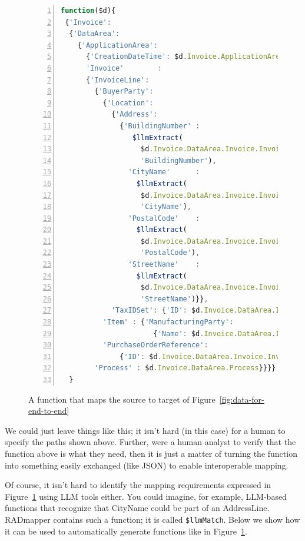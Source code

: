 \documentclass[10pt,letterpaper]{article} %
\newcommand{\stt}[1]{\texttt{#1}} %
\begin{document}
\begin{figure}[H]
  \caption{A function that maps the source to target of Figure~\ref{fig:data-for-end-to-end}}
  \label{fig:mapping-src2tar}
\begin{lstlisting}[language=JavaScript,numberstyle=\scriptsize,basicstyle=\ttfamily\scriptsize,numbers=left,stepnumber=1,breaklines=true]
function($d){
 {'Invoice':
  {'DataArea':
    {'ApplicationArea':
      {'CreationDateTime': $d.Invoice.ApplicationArea.CreationDateTime},
      'Invoice'        :
      {'InvoiceLine':
        {'BuyerParty':
          {'Location':
            {'Address':
              {'BuildingNumber' :
                 $llmExtract(
                   $d.Invoice.DataArea.Invoice.InvoiceLine.BuyerParty.Location.Address.AddressLine,
                   'BuildingNumber'),
                'CityName'      :
                  $llmExtract(
                   $d.Invoice.DataArea.Invoice.InvoiceLine.BuyerParty.Location.Address.AddressLine,
                   'CityName'),
                'PostalCode'    :
                  $llmExtract(
                   $d.Invoice.DataArea.Invoice.InvoiceLine.BuyerParty.Location.Address.AddressLine,
                   'PostalCode'),
                'StreetName'    :
                  $llmExtract(
                   $d.Invoice.DataArea.Invoice.InvoiceLine.BuyerParty.Location.Address.AddressLine,
                   'StreetName')}},
            'TaxIDSet': {'ID': $d.Invoice.DataArea.Invoice.InvoiceLine.BuyerParty.TaxIDSet.ID}},
          'Item' : {'ManufacturingParty':
                      {'Name': $d.Invoice.DataArea.Invoice.InvoiceLine.Item.ManufacturingParty.Name}},
          'PurchaseOrderReference':
              {'ID': $d.Invoice.DataArea.Invoice.InvoiceHeader.PurchaseOrderReference.ID}},
        'Process' : $d.Invoice.DataArea.Process}}}}
  }
\end{lstlisting}
\end{figure}

We could just leave things like this; it isn't hard (in this case) for a human to specify the paths shown above.
Further, were a human analyst to verify that the function above is what they need, then it is just a matter of turning the function into something easily exchanged (like JSON) to enable interoperable mapping.

Of course, it isn't hard to identify the mapping requirements expressed in Figure~\ref{fig:mapping-src2tar} using LLM tools either.
You could imagine, for example, LLM-based functions that recognize that CityName could be part of an AddressLine.
RADmapper contains such a function; it is called \stt{\$llmMatch}.
Below we show how it can be used to automatically generate functions like in Figure~\ref{fig:mapping-src2tar}.
\end{document}
